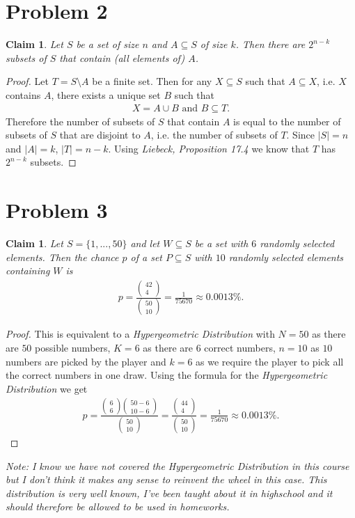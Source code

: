 \documentclass{article}
\newtheorem{claim}[section]{Claim}
\newcommand*\binco[2]{\begin{pmatrix}
    #1\\#2
\end{pmatrix}}
\begin{document}
\section*{Problem 2}
\begin{claim}
  Let $S$ be a set of size $n$ and $A\subseteq S$ of size $k$. Then there are $2^{n-k}$ subsets of $S$ that contain (all elements of) $A$.
\end{claim}
\begin{proof}
  Let $T=S\setminus A$ be a finite set. Then for any $X\subseteq S$ such that $A \subseteq X$, i.e. $X$ contains $A$, there exists a unique set $B$ such that
  \begin{align*}
    X =  A \cup B \text{ and } B\subseteq T.
  \end{align*}
  Therefore the number of subsets of $S$ that contain $A$ is equal to the number of subsets of $S$ that are disjoint to $A$, i.e. the number of subsets of $T$.
  Since $|S|=n$ and $|A|=k$, $|T| = n - k$. Using \emph{Liebeck, Proposition 17.4} we know that $T$ has $2^{n-k}$ subsets.
\end{proof}
\section*{Problem 3}
\begin{claim}
  Let $S=\{1,...,50\}$ and let $W\subseteq S$ be a set with $6$ randomly selected elements. 
  Then the chance $p$ of a set $P\subseteq S$ with $10$ randomly selected elements containing $W$ is
  \begin{align*}
    p = \frac{\binco{42}{4}}{\binco{50}{10}} = \frac{1}{75670} \approx 0.0013\%.
  \end{align*}
\end{claim}
\begin{proof}
  This is equivalent to a \emph{Hypergeometric Distribution} with $N=50$ as there are $50$ possible numbers, $K=6$ as there are $6$ correct numbers, $n=10$ as $10$ numbers are picked by the player and $k=6$ as we require the player to pick all the correct numbers in one draw.
  Using the formula for the \emph{Hypergeometric Distribution} we get
  \begin{align*}
    p = \frac{\binco{6}{6}\binco{50-6}{10-6}}{\binco{50}{10}}= \frac{\binco{44}{4}}{\binco{50}{10}} = \frac{1}{75670} \approx 0.0013 \%.
  \end{align*}
\end{proof}
\noindent\emph{Note: I know we have not covered the Hypergeometric Distribution in this course but I don't think it makes any sense to reinvent the wheel in this case. 
This distribution is very well known, I've been taught about it in highschool and it should therefore be allowed to be used in homeworks.}
\end{document}
